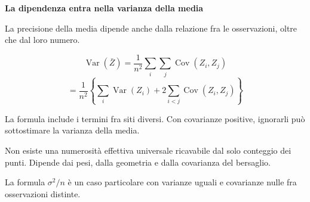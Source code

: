 \documentclass[12pt,aspectratio=1610]{beamer}
\newcommand{\PBody}[1]{\par{\fontsize{11.3}{14.8}\selectfont #1\par}}
\newcommand{\PSmall}[1]{\par{\fontsize{9.8}{13.1}\selectfont #1\par}}
\newcommand{\PInfo}[1]{%
\begin{tcolorbox}[enhanced,arc=1.6mm,boxrule=.55pt,colback=GeoTint,
 colframe=Rule!80!Classical,left=2.3mm,right=2.3mm,top=2mm,bottom=2mm,
 before skip=1mm,after skip=1mm]
\PSmall{#1}\end{tcolorbox}}
\begin{document}
\begin{frame}[plain]\hypertarget{slide88}{}
\begin{lrbox}{\TitleBox}
\begin{minipage}[t]{17.7cm}\raggedright\color{Ink}\fontsize{11.3}{14.8}\selectfont
\color{Navy}\bfseries\fontsize{20.6}{24.5}\selectfont La dipendenza entra nella varianza della media
\end{minipage}\end{lrbox}

\begin{lrbox}{\RecallBox}
\begin{minipage}[t]{14.3cm}\raggedright\color{Ink}\fontsize{11.3}{14.8}\selectfont
\fontsize{10.3}{13.8}\selectfont La precisione della media dipende anche dalla relazione fra le osservazioni, oltre che dal loro numero.
\end{minipage}\end{lrbox}

\begin{lrbox}{\PilotLeftBox}
\begin{minipage}[t]{10.05cm}\raggedright\color{Ink}\fontsize{11.3}{14.8}\selectfont
\[\operatorname{Var}(\bar Z)=\frac{1}{n^2}\sum_i\sum_j\operatorname{Cov}(Z_i,Z_j)\]
\[=\frac{1}{n^2}\left\{\sum_i\operatorname{Var}(Z_i)+2\sum_{i<j}\operatorname{Cov}(Z_i,Z_j)\right\}\]
\PInfo{La formula include i termini fra siti diversi. Con covarianze positive, ignorarli può sottostimare la varianza della media.}

\end{minipage}\end{lrbox}

\begin{lrbox}{\PilotRightBox}
\begin{minipage}[t]{7.55cm}\raggedright\color{Ink}\fontsize{11.3}{14.8}\selectfont
\PBody{Non esiste una numerosità effettiva universale ricavabile dal solo conteggio dei punti. Dipende dai pesi, dalla geometria e dalla covarianza del bersaglio.}
\vspace{2.5mm}
\PBody{La formula $\sigma^2/n$ è un caso particolare con varianze uguali e covarianze nulle fra osservazioni distinte.}
\vspace{2.5mm}


\end{minipage}
\end{lrbox}
\end{frame}
\end{document}
